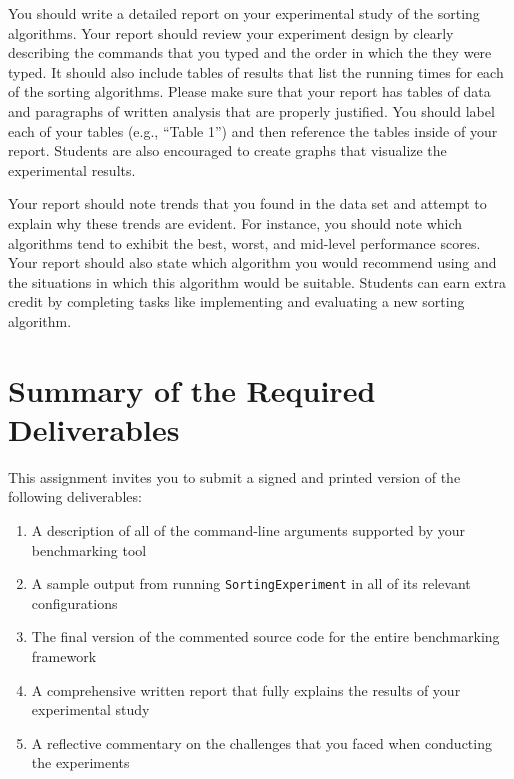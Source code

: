 You should write a detailed report on your experimental study of the sorting algorithms.  Your report should review your
experiment design by clearly describing the commands that you typed and the order in which the they were typed.  It
should also include tables of results that list the running times for each of the sorting algorithms.  Please make sure
that your report has tables of data and paragraphs of written analysis that are properly justified.  You should label
each of your tables (e.g., ``Table 1'') and then reference the tables inside of your report.  Students are also
encouraged to create graphs that visualize the experimental results.  

Your report should note trends that you found in the data set and attempt to explain why these trends are evident.  For
instance, you should note which algorithms tend to exhibit the best, worst, and mid-level performance scores.  Your
report should also state which algorithm you would recommend using and the situations in which this algorithm would be
suitable. Students can earn extra credit by completing tasks like implementing and evaluating a new sorting algorithm.

\section*{Summary of the Required Deliverables}

  This assignment invites you to submit a signed and printed version of the following deliverables: 

  \begin{enumerate} 
  \itemsep0pt
  \item A description of all of the command-line arguments supported by your benchmarking tool 

  \item A sample output from running {\tt SortingExperiment} in all of its relevant configurations

  \item The final version of the commented source code for the entire benchmarking framework 

  \item A comprehensive written report that fully explains the results of your experimental study

  \item A reflective commentary on the challenges that you faced when conducting the experiments
   
  \end{enumerate}


